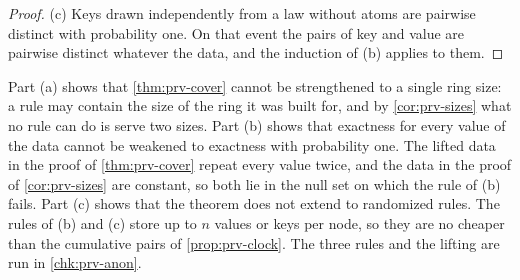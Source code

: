 \begin{proof}
(c) Keys drawn independently from a law without atoms are pairwise distinct with probability one. On that event the pairs of key and value are pairwise distinct whatever the data, and the induction of (b) applies to them.
\end{proof}

Part (a) shows that \cref{thm:prv-cover} cannot be strengthened to a single ring size: a rule may contain the size of the ring it was built for, and by \cref{cor:prv-sizes} what no rule can do is serve two sizes. Part (b) shows that exactness for every value of the data cannot be weakened to exactness with probability one. The lifted data in the proof of \cref{thm:prv-cover} repeat every value twice, and the data in the proof of \cref{cor:prv-sizes} are constant, so both lie in the null set on which the rule of (b) fails. Part (c) shows that the theorem does not extend to randomized rules. The rules of (b) and (c) store up to $n$ values or keys per node, so they are no cheaper than the cumulative pairs of \cref{prop:prv-clock}. The three rules and the lifting are run in \cref{chk:prv-anon}.

